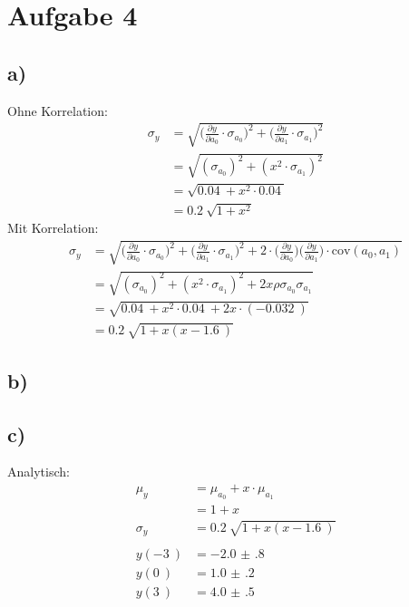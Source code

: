 \newpage\section{Aufgabe 4}
\subsection{a)}
Ohne Korrelation:
\begin{align}
\sigma_y &= \sqrt{\biggl( \frac{\partial y}{\partial a_0}\cdot \sigma_{a_0}\biggr)^2 
+\biggl( \frac{\partial y}{\partial a_1}\cdot \sigma_{a_1}\biggr)^2}\\
&= \sqrt{( \sigma_{a_0})^2 
+ ( x^2\cdot \sigma_{a_1})^2}\\
&= \sqrt{\SI{0.04}{} + x^2 \cdot \SI{0.04}{}}\\
&= \SI{0.2}{}\sqrt{1+x^2}
\end{align}
Mit Korrelation:
\begin{align}
\sigma_y &= \sqrt{\biggl( \frac{\partial y}{\partial a_0}\cdot \sigma_{a_0}\biggr)^2 
+\biggl( \frac{\partial y}{\partial a_1}\cdot \sigma_{a_1}\biggr)^2
+2\cdot\biggl(\frac{\partial y}{\partial a_0}\biggr)\biggl(\frac{\partial y}{\partial a_1}\biggr)\cdot \text{cov}(a_0,a_1)}\\
&= \sqrt{( \sigma_{a_0})^2 
+ ( x^2\cdot \sigma_{a_1})^2
+ 2x \rho\sigma_{a_0}\sigma_{a_1}}\\
&= \sqrt{\SI{0.04}{} + x^2 \cdot \SI{0.04}{} + 2x\cdot(\SI{-0.032}{})}\\
&= \SI{0.2}{}\sqrt{1+x(x-\SI{1.6}{})}
\end{align}
\subsection{b)}
\subsection{c)}
Analytisch:
\begin{align}
\mu_y &= \mu_{a_0} + x\cdot \mu_{a_1}\\
& = \SI{1}+ x\\
\sigma_y &= \SI{0.2}{}\sqrt{1+x(x-\SI{1.6}{})}\\ \\
y(\SI{-3}{})&=\SI{-2.0(8)}{}\\
y(\SI{0}{})&=\SI{1.0(2)}{}\\
y(\SI{3}{})&=\SI{4.0(5)}{}
\end{align}
